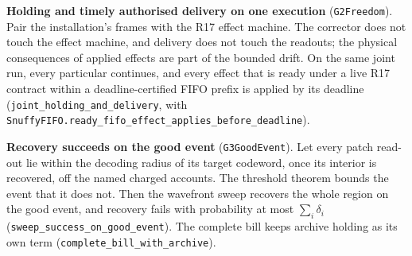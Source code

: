 \documentclass[
]{article}
\begin{document}
\textbf{Holding and timely authorised delivery on one execution}
(\texttt{G2Freedom}). Pair the installation's frames with the R17 effect
machine. The corrector does not touch the effect machine, and delivery
does not touch the readouts; the physical consequences of applied
effects are part of the bounded drift. On the same joint run, every
particular continues, and every effect that is ready under a live R17
contract within a deadline-certified FIFO prefix is applied by its
deadline
(\texttt{j\allowbreak{}o\allowbreak{}i\allowbreak{}n\allowbreak{}t\allowbreak{}\_\allowbreak{}h\allowbreak{}o\allowbreak{}l\allowbreak{}d\allowbreak{}i\allowbreak{}n\allowbreak{}g\allowbreak{}\_\allowbreak{}a\allowbreak{}n\allowbreak{}d\allowbreak{}\_\allowbreak{}d\allowbreak{}e\allowbreak{}l\allowbreak{}i\allowbreak{}v\allowbreak{}e\allowbreak{}r\allowbreak{}y},
with
\texttt{S\allowbreak{}n\allowbreak{}u\allowbreak{}f\allowbreak{}f\allowbreak{}y\allowbreak{}F\allowbreak{}I\allowbreak{}F\allowbreak{}O\allowbreak{}.\allowbreak{}r\allowbreak{}e\allowbreak{}a\allowbreak{}d\allowbreak{}y\allowbreak{}\_\allowbreak{}f\allowbreak{}i\allowbreak{}f\allowbreak{}o\allowbreak{}\_\allowbreak{}e\allowbreak{}f\allowbreak{}f\allowbreak{}e\allowbreak{}c\allowbreak{}t\allowbreak{}\_\allowbreak{}a\allowbreak{}p\allowbreak{}p\allowbreak{}l\allowbreak{}i\allowbreak{}e\allowbreak{}s\allowbreak{}\_\allowbreak{}b\allowbreak{}e\allowbreak{}f\allowbreak{}o\allowbreak{}r\allowbreak{}e\allowbreak{}\_\allowbreak{}d\allowbreak{}e\allowbreak{}a\allowbreak{}d\allowbreak{}l\allowbreak{}i\allowbreak{}n\allowbreak{}e}).

\textbf{Recovery succeeds on the good event} (\texttt{G3GoodEvent}). Let
every patch read-out lie within the decoding radius of its target
codeword, once its interior is recovered, off the named charged
accounts. The threshold theorem bounds the event that it does not. Then
the wavefront sweep recovers the whole region on the good event, and
recovery fails with probability at most \(\sum_i\delta_i\)
(\texttt{s\allowbreak{}w\allowbreak{}e\allowbreak{}e\allowbreak{}p\allowbreak{}\_\allowbreak{}s\allowbreak{}u\allowbreak{}c\allowbreak{}c\allowbreak{}e\allowbreak{}s\allowbreak{}s\allowbreak{}\_\allowbreak{}o\allowbreak{}n\allowbreak{}\_\allowbreak{}g\allowbreak{}o\allowbreak{}o\allowbreak{}d\allowbreak{}\_\allowbreak{}e\allowbreak{}v\allowbreak{}e\allowbreak{}n\allowbreak{}t}).
The complete bill keeps archive holding as its own term
(\texttt{c\allowbreak{}o\allowbreak{}m\allowbreak{}p\allowbreak{}l\allowbreak{}e\allowbreak{}t\allowbreak{}e\allowbreak{}\_\allowbreak{}b\allowbreak{}i\allowbreak{}l\allowbreak{}l\allowbreak{}\_\allowbreak{}w\allowbreak{}i\allowbreak{}t\allowbreak{}h\allowbreak{}\_\allowbreak{}a\allowbreak{}r\allowbreak{}c\allowbreak{}h\allowbreak{}i\allowbreak{}v\allowbreak{}e}).
\end{document}

